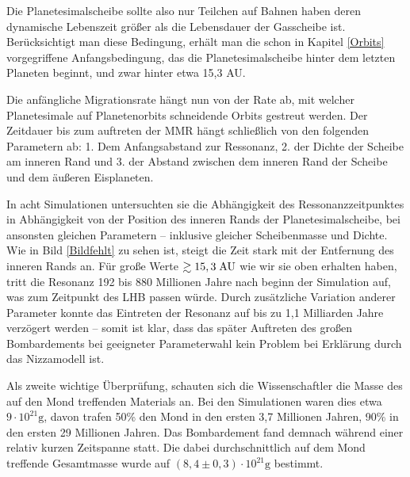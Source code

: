 \documentclass[10pt,a4paper,twoside]{article}
\begin{document}
Die Planetesimalscheibe sollte also nur Teilchen auf Bahnen haben deren dynamische Lebenszeit größer als die Lebensdauer der Gasscheibe ist.\cite{Gomes2005} Berücksichtigt man diese Bedingung, erhält man die schon in Kapitel \ref{Orbits} vorgegriffene Anfangsbedingung, das die Planetesimalscheibe hinter dem letzten Planeten beginnt, und zwar hinter etwa 15,3 AU.\cite{Gomes2005}

Die anfängliche Migrationsrate hängt nun von der Rate ab, mit welcher Planetesimale auf Planetenorbits schneidende Orbits gestreut werden. Der Zeitdauer bis zum auftreten der MMR hängt schließlich von den folgenden Parametern ab:
1. Dem Anfangsabstand zur Ressonanz, 2. der Dichte der Scheibe am inneren Rand und 3. der Abstand zwischen dem inneren Rand der Scheibe und dem äußeren Eisplaneten.\cite{Gomes2005}

In acht Simulationen untersuchten sie die Abhängigkeit des Ressonanzzeitpunktes in Abhängigkeit von der Position des inneren Rands der Planetesimalscheibe, bei ansonsten gleichen Parametern – inklusive gleicher Scheibenmasse und Dichte. Wie in Bild \ref{Bildfehlt} zu sehen ist, steigt die Zeit stark mit der Entfernung des inneren Rands an. Für große Werte $\gtrsim 15,3 \;\mathrm{AU}$ wie wir sie oben erhalten haben, tritt die Resonanz 192 bis 880 Millionen Jahre nach beginn der Simulation auf, was zum Zeitpunkt des LHB passen würde.\cite{Gomes2005} %
Durch zusätzliche Variation anderer Parameter konnte das Eintreten der Resonanz auf bis zu 1,1 Milliarden Jahre\cite{Gomes2005} verzögert werden – somit ist klar, dass das später Auftreten des großen Bombardements bei geeigneter Parameterwahl kein Problem bei Erklärung durch das Nizzamodell ist.

Als zweite wichtige Überprüfung, schauten sich die Wissenschaftler die Masse des auf den Mond treffenden Materials an. Bei den Simulationen waren dies etwa $9 \cdot 10^{21} \mathrm{g}$, davon trafen 50\% den Mond in den ersten 3,7 Millionen Jahren, 90\% in den ersten 29 Millionen Jahren. Das Bombardement fand demnach während einer relativ kurzen Zeitspanne statt. Die dabei durchschnittlich auf dem Mond treffende Gesamtmasse wurde auf $\left(8,4 \pm 0,3\right) \cdot 10^{21} \mathrm{g}$ bestimmt\cite{Gomes2005}.
\end{document}

